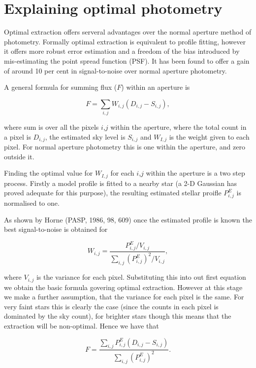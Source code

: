\documentclass[twoside,11pt]{article}
\newcommand{\htmladdnormallink}[2]{#1}
\newcommand{\xlabel}[1]{}
\renewcommand{\_}{\texttt{\symbol{95}}}
\begin{document}
\section{\xlabel{Explaining_optimal_photometry}Explaining \xlabel{explaining}\label{explaining}optimal photometry}

Optimal extraction offers serveral advantages over the normal aperture 
method of photometry. Formally optimal extraction is equivalent to profile
fitting, however it offers more robust error estimation and a freedom of
the bias introduced by mis-estimating the point spread function (PSF). It has been found to offer a gain of around 10 per cent in signal-to-noise over normal aperture photometry.

A general formula for summing flux ($F$) within an aperture is

\[F=\sum_{i,j}W_{i,j}(D_{i,j}-S_{i,j}),\]

where sum is over all the pixels $i$,$j$ within the aperture, where the total
count in a pixel is $D_{i,j}$, the estimated sky level is $S_{i,j}$ and $W_{I,j}$ is the weight given to each pixel. For normal aperture photometry
this is one within the aperture, and zero outside it.

Finding the optimal value for $W_{I,j}$ for each $i$,$j$ within the aperture is a two step process. Firstly a model profile is fitted to a nearby star (a 2-D Gaussian has proved adequate for this purpose), the resulting estimated stellar proifle $P_{i,j}^{E}$ is normalised to one.

As shown by Horne (\htmladdnormallink{PASP, 1986, 98, 609}{http://cdsads.u-strasbg.fr/cgi-bin/nph-bib_query?bibcode=1986PASP...98..609H&db_key=AST&nosetcookie=1&high=375ea70ad608221}) once the estimated profile is known the best signal-to-noise is obtained for

\[W_{i,j}=\frac{P_{i,j}^{E}/V_{i,j}}{\sum_{i,j}(P_{i,j}^{E})^2/V_{i,j}},\]

where $V_{i,j}$ is the variance for each pixel. Substituting this into out
first equation we obtain the basic formula govering optimal extraction. However at this stage we make a further assumption, that the variance for each pixel is the same. For very faint stars this is clearly the case (since the counts in each pixel is dominated by the sky count), for brighter stars though this means that the extraction will be non-optimal. Hence we have that

\[F=\frac{\sum_{i,j}P_{i,j}^{E}(D_{i,j}-S_{i,j})}{\sum_{i,j}(P_{i,j}^{E})^2}.\]
\end{document}
